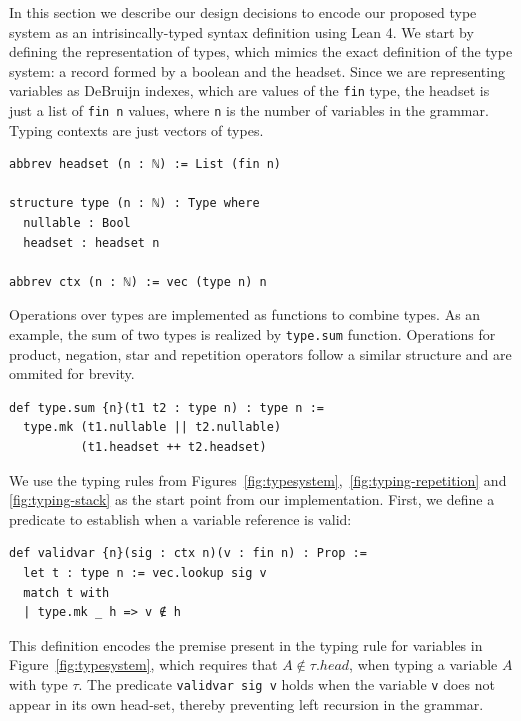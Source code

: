 \documentclass[preprint,12pt]{elsarticle}
\theoremstyle{definition}
\begin{document}
In this section we describe our design decisions to encode our proposed type system
as an intrisincally-typed syntax definition using Lean 4.
We start by defining the representation of types, which mimics the exact definition
of the type system: a record formed by a boolean and the headset. Since we are representing
variables as DeBruijn indexes, which are values of the \lstinline|fin| type, the headset is
just a list of \lstinline|fin n| values, where \lstinline|n| is the number of variables in
the grammar. Typing contexts are just vectors of types.
\begin{lstlisting}
abbrev headset (n : ℕ) := List (fin n)

structure type (n : ℕ) : Type where
  nullable : Bool
  headset : headset n

abbrev ctx (n : ℕ) := vec (type n) n
\end{lstlisting}
Operations over types are implemented as functions to combine types. As an example,
the sum of two types is realized by \lstinline|type.sum| function. Operations for
product, negation, star and repetition operators follow a similar structure and
are ommited for brevity.
\begin{lstlisting}
def type.sum {n}(t1 t2 : type n) : type n :=
  type.mk (t1.nullable || t2.nullable)
          (t1.headset ++ t2.headset)
\end{lstlisting}
We use the typing rules from Figures~\ref{fig:typesystem},~\ref{fig:typing-repetition}
and \ref{fig:typing-stack} as the start point from our implementation. First, we
define a predicate to establish when a variable reference is valid:
\begin{lstlisting}
def validvar {n}(sig : ctx n)(v : fin n) : Prop :=
  let t : type n := vec.lookup sig v
  match t with
  | type.mk _ h => v ∉ h
\end{lstlisting}
This definition encodes the premise present in the typing rule for variables in
Figure~\ref{fig:typesystem}, which requires that $A \not\in \tau.head$, when
typing a variable $A$ with type $\tau$. The predicate \lstinline|validvar sig v|
holds when the variable \lstinline|v| does not appear in its own head-set,
thereby preventing left recursion in the grammar.
\end{document}
